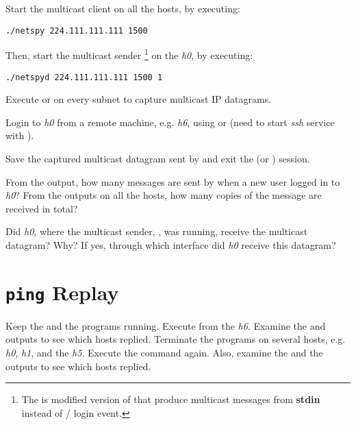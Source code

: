 \documentclass{../UTNetLab}
\begin{document}
Start the multicast client  on all the hosts, by executing:
\begin{lstlisting}
./netspy 224.111.111.111 1500
    \end{lstlisting}
Then, start the multicast sender \footnote{The  is modified version of  that produce multicast messages from \textbf{stdin} instead of / login event.} on the \textit{h0}, by executing:
\begin{lstlisting}
./netspyd 224.111.111.111 1500 1
    \end{lstlisting}
Execute  or  on every subnet to capture multicast IP datagrams.

Login to \textit{h0} from a remote machine, e.g. \textit{h6}, using  or  (need to start \textit{ssh} service with ).

Save the captured multicast datagram sent by  and exit the  (or ) session.

\begin{report}
    \item From the  output, how many messages are sent by  when a new user logged in to \textit{h0}?
    From the  outputs on all the hosts, how many copies of the message are received in total?

    \item Did \textit{h0}, where the multicast sender, , was running, receive the multicast datagram?
    Why?
    If yes, through which interface did \textit{h0} receive this datagram?
\end{report}

\section{\texttt{ping} Replay}
Keep the  and the  programs running.
Execute  from the \textit{h6}.
Examine the  and  outputs to see which hosts replied.
Terminate the  programs on several hosts, e.g. \textit{h0}, \textit{h1}, and the \textit{h5}.
Execute the  command again.
Also, examine the  and the  outputs to see which hosts replied.
\end{document}
